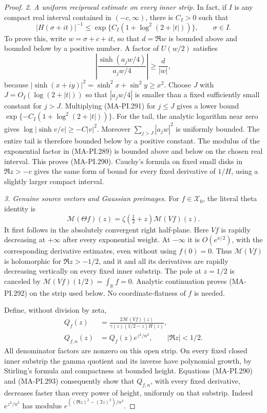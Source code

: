 \begin{proof}
\emph{2. A uniform reciprocal estimate on every inner strip.}
In fact, if \(I\) is any compact real interval contained
in \((-c,\infty)\), there is \(C_I>0\) such that
\[
 |H(\sigma+it)|^{-1}
       \le \exp\{C_I(1+\log^2(2+|t|))\},
       \qquad \sigma\in I.
 \tag{MA-PI.290}
\]
To prove this, write \(w=\sigma+c+it\), so that
\(d=\Re w\) is bounded above and bounded below by
a positive number.  A factor of \(U(w/2)\) satisfies
\[
 \left|\frac{\sinh(a_jw/4)}{a_jw/4}\right|
       \ge\frac{d}{|w|},
 \tag{MA-PI.291}
\]
because
\(|\sinh(x+iy)|^2=\sinh^2x+\sin^2y\ge x^2\).
Choose \(J\) with \(J=O_I(\log(2+|t|))\) so that
\(|a_jw/4|\) is smaller than a fixed sufficiently small
constant for \(j>J\).  Multiplying (MA-PI.291) for
\(j\le J\) gives a lower bound
\(\exp\{-C_I(1+\log^2(2+|t|))\}\).
For the tail, the analytic logarithm near zero gives
\(\log|\sinh v/v|\ge-C|v|^2\).  Moreover
\(\sum_{j>J}|a_jw|^2\) is uniformly bounded.
The entire tail is therefore bounded below by a
positive constant.  The modulus of the exponential
factor in (MA-PI.289) is bounded above and below on
the chosen real interval.  This proves (MA-PI.290).
Cauchy's formula on fixed small disks in
\(\Re z>-c\) gives the same form of bound for every
fixed derivative of \(1/H\), using a slightly larger
compact interval.

\emph{3. Genuine source vectors and Gaussian preimages.}
For \(f\in\mathscr X_0\), the literal theta identity is
\[
 \mathcal M(\Theta f)(z)
       =\zeta(\tfrac12+z)\mathcal M(Vf)(z).
 \tag{MA-PI.292}
\]
It first follows in the absolutely convergent right
half-plane.  Here \(Vf\) is rapidly decreasing at
\(+\infty\) after every exponential weight.  At
\(-\infty\) it is \(O(e^{x/2})\), with the corresponding
derivative estimates, even without using \(f(0)=0\).
Thus \(\mathcal M(Vf)\) is holomorphic for
\(\Re z>-1/2\), and it and all its derivatives are
rapidly decreasing vertically on every fixed inner
substrip.  The pole at \(z=1/2\) is canceled by
\(\mathcal M(Vf)(1/2)=\int_{\mathbb R}f=0\).
Analytic continuation proves (MA-PI.292) on the
strip used below.  No coordinate-flatness of \(f\)
is needed.

Define, without division by zeta,
\[
 \begin{aligned}
 Q_f(z)&=
   \frac{2\mathcal M(Vf)(z)}
        {\gamma(z)(1/2-z)H(z)},\\
 Q_{f,n}(z)&=Q_f(z)e^{z^2/n^2},
                   \qquad |\Re z|<1/2.
 \end{aligned}
 \tag{MA-PI.293}
\]
All denominator factors are nonzero on this open
strip.  On every fixed closed inner substrip the
gamma quotient and its inverse have polynomial
growth, by Stirling's formula and compactness at
bounded height.  Equations (MA-PI.290) and
(MA-PI.293) consequently show that \(Q_{f,n}\),
with every fixed derivative, decreases faster than
every power of height, uniformly on that substrip.
Indeed \(e^{z^2/n^2}\) has modulus
\(e^{((\Re z)^2-(\Im z)^2)/n^2}\).


\end{proof}
